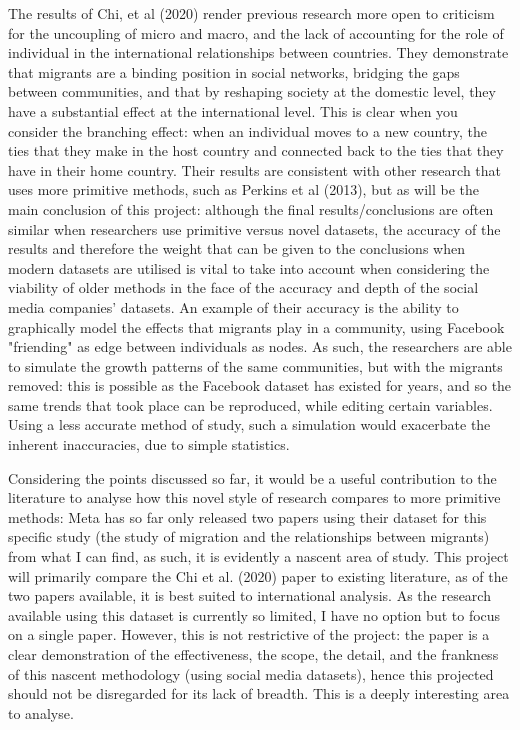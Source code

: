 \documentclass[12pt]{article}
\begin{document}
The results of Chi, et al (2020) render previous research more open to criticism for the 
uncoupling of micro and macro, and the lack of accounting for the role of individual in 
the international relationships between countries. They demonstrate that migrants are a 
binding position in social networks, bridging the gaps between communities, and that by 
reshaping society at the domestic level, they have a substantial effect at the international 
level. This is clear when you consider the branching effect: when an individual moves 
to a new country, the ties that they make in the host country and connected back to the ties 
that they have in their home country. Their results are consistent with other research 
that uses more primitive methods, such as Perkins et al (2013), but as will be the main conclusion of this project: although the final 
results/conclusions are often similar when researchers use primitive versus novel datasets, 
the accuracy of the results and therefore the weight that can be 
given to the conclusions when modern datasets are utilised is vital to take into account 
when considering the viability of older methods in the face of the accuracy and depth of 
the social media companies' datasets.
An example of their accuracy is the ability to graphically model the effects that migrants 
play in a community, using Facebook "friending" as edge between individuals as nodes. As such,
the researchers are able to simulate the growth patterns of the same communities, but with the 
migrants removed: this is possible as the Facebook dataset has existed for years, and so 
the same trends that took place can be reproduced, while editing certain variables. Using a 
less accurate method of study, such a simulation would exacerbate the inherent inaccuracies, 
due to simple statistics.

Considering the points discussed so far, it would be a useful contribution to the literature to 
analyse how this novel style of research compares to more primitive methods: Meta has so far 
only released two papers using their dataset for this specific study (the study of migration 
and the relationships between migrants) from what I can find, as such, it is evidently a 
nascent area of study. This project will primarily compare the Chi et al. (2020) paper to 
existing literature, as of the two papers available, it is best suited to international 
analysis. As the research available using this dataset is currently so limited, I have no option 
but to focus on a single paper. However, this is not restrictive of the project: the paper is 
a clear demonstration of the effectiveness, the scope, the detail, and the frankness of this 
nascent methodology (using social media datasets), hence this projected should not be disregarded 
for its lack of breadth. This is a deeply interesting area to analyse.
\end{document}
